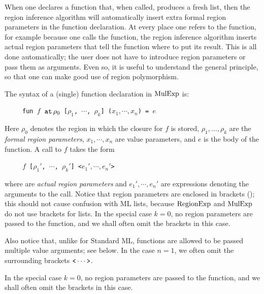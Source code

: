 \documentclass[12pt]{book}
\begin{document}
When one declares a function that, when called, produces a fresh list,
then the region inference algorithm will automatically insert extra
%
formal region parameters in the function declaration.  At every place
one refers to the function, for example because one calls the
function, the region inference algorithm inserts
%
actual region parameters that tell the function where to put its
result. This is all done automatically; the user does not have to
introduce region parameters or pass them as arguments. Even so, it is
useful to understand the general principle, so that one can make good
use of region polymorphism.

The syntax of a (single) function declaration in $\hbox{\rm MulExp}$ is:
\begin{tabbing}
\ \ \ \ \ \=\tt fun $f$ $\mathbin{\hbox{\tt at}}\,\rho_0$ [$\rho_1$, $\cdots$, $\rho_k$] ($x_1,\cdots,x_n$) = $e$
\end{tabbing}
Here $\rho_0$ denotes the region in which the closure for $f$ is
stored, $\rho_1, \ldots,\rho_k$ are the
%
{\em formal region parameters}, $x_1,\cdots,x_n$ are
value parameters, and $e$ is the body of the function.
A call to $f$ takes the form
\begin{tabbing}
\ \ \ \ \ \=\tt $f$  [$\rho_1'$, $\cdots$, $\rho_k'$] <$e_1',\cdots,e_n'$>
\end{tabbing}
where  are
%
{\em actual region parameters} and $e_1',\cdots,e_n'$ are expressions
denoting the arguments to the call. Notice that region parameters are
enclosed in brackets (\boxml{[ ]}); this should not cause confusion
with ML lists, because $\hbox{\rm RegionExp}$ and $\hbox{\rm MulExp}$ do not use
%
brackets for lists. In the special case $k=0$, no region parameters
are passed to the function, and we shall often omit the brackets in
this case.

Also notice that, unlike for Standard ML, functions are allowed to be
passed multiple value arguments; see below. In the case $n=1$, we
often omit the surrounding brackets $\verb+<+ \cdots \verb+>+$.

In the special case $k=0$, no region parameters are passed to the
function, and we shall often omit the brackets in this case.
\end{document}
